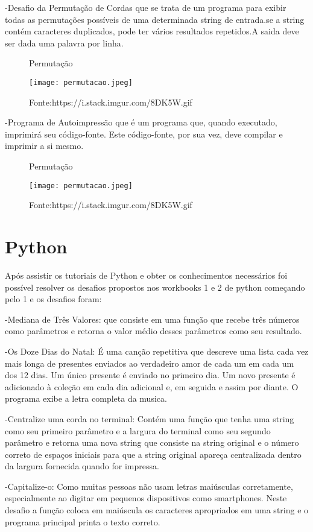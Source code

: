     -Desafio da Permutação de Cordas que se trata de um programa para exibir todas as permutações possíveis de uma determinada string de entrada.se a string contém caracteres duplicados, pode ter vários resultados repetidos.A saida deve ser dada uma palavra por linha.

\begin{figure} [h!]	
    \centering
    \caption{Permutação}
    \texttt{[image: permutacao.jpeg]}
    \caption*{Fonte:https://i.stack.imgur.com/8DK5W.gif}
    \label{fig:permutacaodeletras}
\end{figure}

-Programa de Autoimpressão que é um programa que, quando executado, imprimirá seu código-fonte. Este código-fonte, por sua vez, deve compilar e imprimir a si mesmo. 

\begin{figure} [h!]	
    \centering
    \caption{Permutação}
    \texttt{[image: permutacao.jpeg]}
    \caption*{Fonte:https://i.stack.imgur.com/8DK5W.gif}
    \label{fig:permutacaodeletras}
\end{figure}
\section{Python}
Após assistir os tutoriais de Python e obter os conhecimentos necessários foi possível resolver os desafios propostos nos workbooks 1 e 2 de python começando pelo 1 e os desafios foram: 

-Mediana de Três Valores: que consiste em uma função que recebe três números como parâmetros e retorna o valor médio desses parâmetros como seu resultado.

-Os Doze Dias do Natal: É uma canção repetitiva que descreve uma lista cada vez mais longa de presentes enviados ao verdadeiro amor de cada um em cada um dos 12 dias. Um único presente é enviado no primeiro dia. Um novo presente é adicionado à coleção em cada dia adicional e, em seguida e assim por diante.
O programa exibe a letra completa da musica.

-Centralize uma corda no terminal: Contém uma função que tenha uma string como seu primeiro parâmetro e a largura do terminal como seu segundo parâmetro e retorna uma nova string que consiste na string original e o número correto de espaços iniciais para que a string original apareça centralizada dentro da largura fornecida quando for impressa.

-Capitalize-o: Como muitas pessoas não usam letras maiúsculas corretamente, especialmente ao digitar em pequenos dispositivos como smartphones. Neste desafio a função coloca em maiúscula os caracteres apropriados em uma string e o programa principal printa o texto correto.

